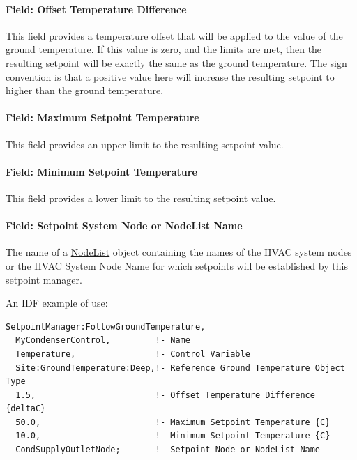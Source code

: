\paragraph{Field: Offset Temperature Difference}\label{field-offset-temperature-difference-2}

This field provides a temperature offset that will be applied to the value of the ground temperature. If this value is zero, and the limits are met, then the resulting setpoint will be exactly the same as the ground temperature. The sign convention is that a positive value here will increase the resulting setpoint to higher than the ground temperature.

\paragraph{Field: Maximum Setpoint Temperature}\label{field-maximum-setpoint-temperature-7}

This field provides an upper limit to the resulting setpoint value.

\paragraph{Field: Minimum Setpoint Temperature}\label{field-minimum-setpoint-temperature-7}

This field provides a lower limit to the resulting setpoint value.

\paragraph{Field: Setpoint System Node or NodeList Name}\label{field-setpoint-system-node-or-nodelist-name-1}

The name of a \hyperref[nodelist]{NodeList} object containing the names of the HVAC system nodes or the HVAC System Node Name for which setpoints will be established by this setpoint manager.

An IDF example of use:

\begin{lstlisting}
SetpointManager:FollowGroundTemperature,
  MyCondenserControl,         !- Name
  Temperature,                !- Control Variable
  Site:GroundTemperature:Deep,!- Reference Ground Temperature Object Type
  1.5,                        !- Offset Temperature Difference {deltaC}
  50.0,                       !- Maximum Setpoint Temperature {C}
  10.0,                       !- Minimum Setpoint Temperature {C}
  CondSupplyOutletNode;       !- Setpoint Node or NodeList Name
\end{lstlisting}

